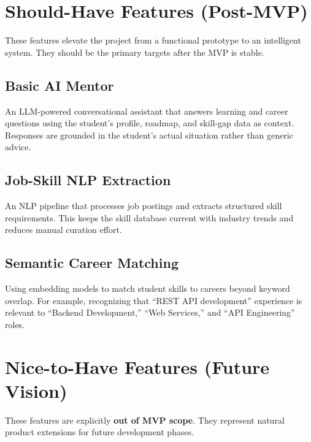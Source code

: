 \documentclass[12pt,a4paper]{article}
\begin{document}
\newpage

\section{Should-Have Features (Post-MVP)}

These features elevate the project from a functional prototype to an intelligent system. They should be the primary targets after the MVP is stable.

\subsection{Basic AI Mentor}
An LLM-powered conversational assistant that answers learning and career questions using the student's profile, roadmap, and skill-gap data as context. Responses are grounded in the student's actual situation rather than generic advice.

\subsection{Job-Skill NLP Extraction}
An NLP pipeline that processes job postings and extracts structured skill requirements. This keeps the skill database current with industry trends and reduces manual curation effort.

\subsection{Semantic Career Matching}
Using embedding models to match student skills to careers beyond keyword overlap. For example, recognizing that ``REST API development'' experience is relevant to ``Backend Development,'' ``Web Services,'' and ``API Engineering'' roles.

\newpage

\section{Nice-to-Have Features (Future Vision)}

These features are explicitly \textbf{out of MVP scope}. They represent natural product extensions for future development phases.
\end{document}
